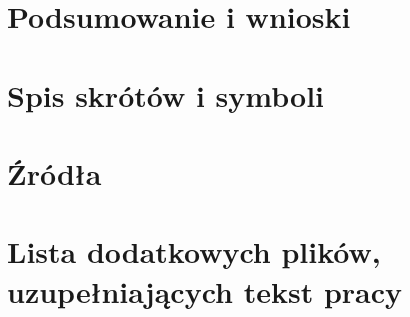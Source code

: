 \documentclass[a4paper,twoside,12pt]{book}
\begin{document}
\chapter{Podsumowanie i wnioski}



\backmatter
\printbibliography           %

\begin{appendices}

\chapter{Spis skrótów i symboli}


\chapter{Źródła}


\chapter{Lista dodatkowych plików, uzupełniających tekst pracy} 


\end{appendices}
\end{document}

